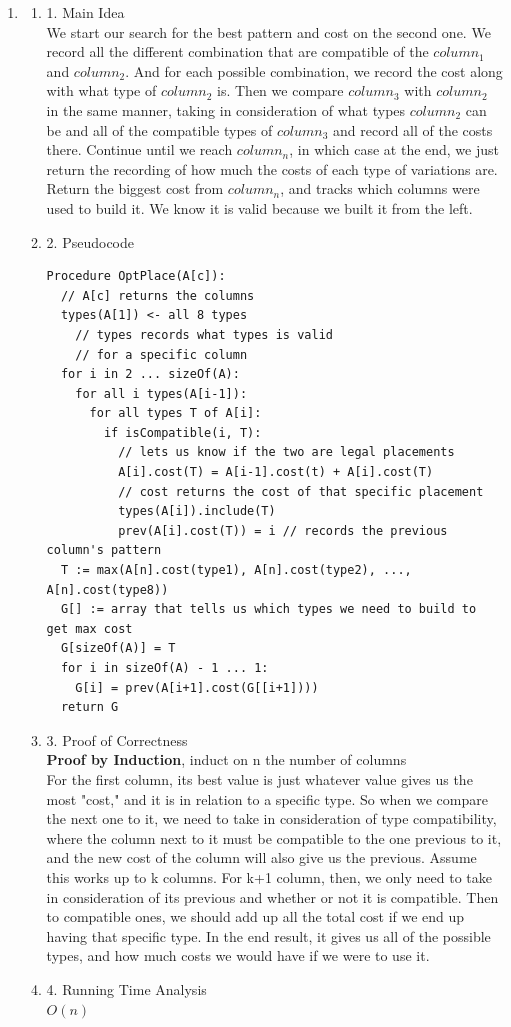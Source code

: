 \documentclass[11pt]{article}
\newenvironment{qparts}{\begin{enumerate}[{(}a{)}]}{\end{enumerate}}
\begin{document}
\begin{qparts}
\item \begin{qparts} \item[1.] Main Idea \\
We start our search for the best pattern and cost on the second one. We record all the different combination that are compatible of the $column_1$ and $column_2$. And for each possible combination, we record the cost along with what type of $column_2$ is. Then we compare $column_3$ with $column_2$ in the same manner, taking in consideration of what types $column_2$ can be and all of the compatible types of $column_3$ and record all of the costs there. Continue until we reach $column_n$, in which case at the end, we just return the recording of how much the costs of each type of variations are. Return the biggest cost from $column_n$, and tracks which columns were used to build it. We know it is valid because we built it from the left. 
\item[2.] Pseudocode
\begin{verbatim}
Procedure OptPlace(A[c]):
  // A[c] returns the columns
  types(A[1]) <- all 8 types 
    // types records what types is valid
    // for a specific column
  for i in 2 ... sizeOf(A):
    for all i types(A[i-1]):
      for all types T of A[i]:
        if isCompatible(i, T): 
          // lets us know if the two are legal placements
          A[i].cost(T) = A[i-1].cost(t) + A[i].cost(T)
          // cost returns the cost of that specific placement
          types(A[i]).include(T)
          prev(A[i].cost(T)) = i // records the previous column's pattern
  T := max(A[n].cost(type1), A[n].cost(type2), ..., A[n].cost(type8))
  G[] := array that tells us which types we need to build to get max cost
  G[sizeOf(A)] = T   
  for i in sizeOf(A) - 1 ... 1:
    G[i] = prev(A[i+1].cost(G[[i+1])))
  return G
\end{verbatim}
\item[3.] Proof of Correctness \\
\textbf{Proof by Induction}, induct on n the number of columns \\
For the first column, its best value is just whatever value gives us the most "cost," and it is in relation to a specific type. So when we compare the next one to it, we need to take in consideration of type compatibility, where the column next to it must be compatible to the one previous to it, and the new cost of the column will also give us the previous. Assume this works up to k columns. For k+1 column, then, we only need to take in consideration of its previous and whether or not it is compatible. Then to compatible ones, we should add up all the total cost if we end up having that specific type. In the end result, it gives us all of the possible types, and how much costs we would have if we were to use it. 
\item[4.] Running Time Analysis \\
$O(n)$ \\


\end{qparts}
\end{qparts}
\end{document}
